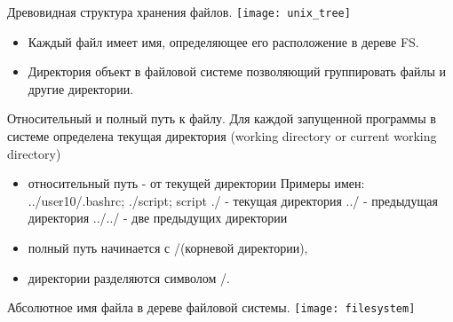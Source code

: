 
\begin{frame}{Древовидная структура хранения файлов.}
\texttt{[image: unix\_tree]} 
  \begin{itemize}
    \item Каждый файл имеет \alert{имя}, определяющее его расположение в дереве FS.
    \item \alert{Директория} объект в файловой системе позволяющий группировать файлы и другие директории.
  \end{itemize}
\end{frame}

\begin{frame}[fragile]{Относительный и полный путь к файлу.}
 Для каждой запущенной программы в системе определена \alert{текущая директория} 
 (working directory or current working directory) 
  \begin{itemize}
    \item \alert{относительный путь} - от текущей директории \newline
      Примеры имен: ../user10/.bashrc; ./script; script \newline
        \alert{./} - текущая директория \newline 
        \alert{../} - предыдущая директория \newline 
        \alert{../../} - две предыдущих директории 
    \item \alert{полный путь} начинается с \alert{/}(корневой директории), 
    \item директории разделяются символом \alert{/}. \newline
  \end{itemize}
\end{frame}


\begin{frame}{Абсолютное имя файла в дереве файловой системы.}
\texttt{[image: filesystem]} 
\end{frame}

%
%

